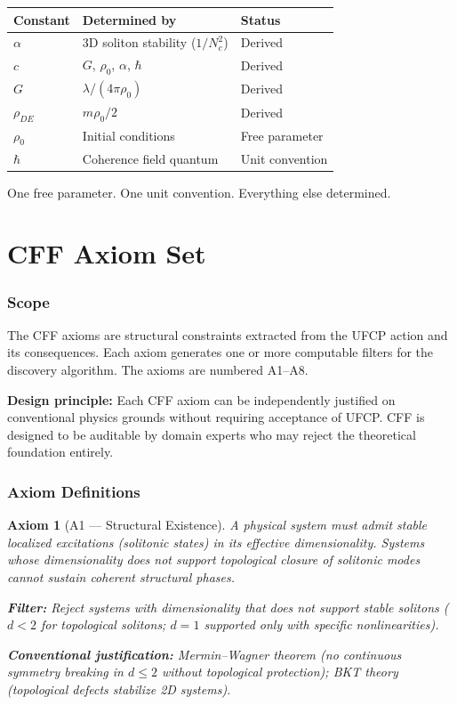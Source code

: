 \documentclass[11pt, a4paper]{article}
\newtheorem{axiom}{Axiom}[section]
\begin{document}
\begin{center}
\begin{tabular}{@{}lll@{}}
\toprule
\textbf{Constant} & \textbf{Determined by} & \textbf{Status} \\
\midrule
$\alpha$ & 3D soliton stability ($1/N_c^2$) & Derived \\
$c$ & $G$, $\rho_0$, $\alpha$, $\hbar$ & Derived \\
$G$ & $\lambda/(4\pi\rho_0)$ & Derived \\
$\rho_{DE}$ & $m\rho_0/2$ & Derived \\
$\rho_0$ & Initial conditions & Free parameter \\
$\hbar$ & Coherence field quantum & Unit convention \\
\bottomrule
\end{tabular}
\end{center}

One free parameter. One unit convention. Everything else
determined.

\newpage
\part{CFF Axiom Set}

\section{Scope}

The CFF axioms are structural constraints extracted from the
UFCP action and its consequences. Each axiom generates one or
more computable filters for the discovery algorithm. The axioms
are numbered A1--A8.

\textbf{Design principle:} Each CFF axiom can be independently
justified on conventional physics grounds without requiring
acceptance of UFCP. CFF is designed to be auditable by domain
experts who may reject the theoretical foundation entirely.

\section{Axiom Definitions}

\begin{axiom}[A1 --- Structural Existence]
\label{ax:a1}
A physical system must admit stable localized excitations
(solitonic states) in its effective dimensionality. Systems
whose dimensionality does not support topological closure of
solitonic modes cannot sustain coherent structural phases.

\textbf{Filter:} Reject systems with dimensionality that does
not support stable solitons ($d < 2$ for topological solitons;
$d = 1$ supported only with specific nonlinearities).

\textbf{Conventional justification:} Mermin--Wagner theorem
(no continuous symmetry breaking in $d \leq 2$ without
topological protection); BKT theory (topological defects
stabilize 2D systems).
\end{axiom}
\end{document}

